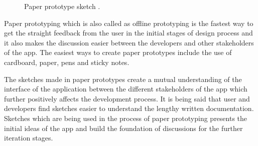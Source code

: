 \begin{figure}[hbt!] 
  \centering
  \qquad
  \caption[Paper prototype sketch ]{Paper prototype sketch .}
  \label{fig:Paper_proto}
\end{figure}
Paper prototyping which is also called as offline prototyping is the fastest way to get the straight feedback from the user in the initial stages of design process and it also makes the discussion easier between the developers and other stakeholders of the app. The easiest ways to create paper prototypes include the use of cardboard, paper, pens and sticky notes.\citep{Bansemir2014ExperienceVisualizations}

The sketches made in paper prototypes create a mutual understanding of the interface of the application between the different stakeholders of the app which further positively affects the development process. It is being said that user and developers find sketches easier to understand the lengthy written documentation. Sketches which are being used in the process of paper prototyping presents the initial ideas of the app and build the foundation of discussions for the further iteration stages\citep{Bansemir2014ExperienceVisualizations}.

